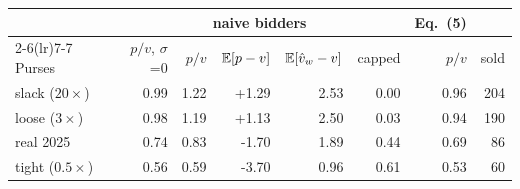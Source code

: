 \begin{tabular}{@{}lrrrrrrr@{}}\toprule
& \multicolumn{5}{c}{naive bidders} & Eq.~(5) & \\\cmidrule(lr){2-6}\cmidrule(lr){7-7}
Purses & $p/v$, $\sigma$=0 & $p/v$ & $\mathbb{E}[p-v]$ & $\mathbb{E}[\hat v_w-v]$ & capped & $p/v$ & sold\\\midrule
slack ($20\times$) & 0.99 & 1.22 & +1.29 & 2.53 & 0.00 & 0.96 & 204\\
loose ($3\times$) & 0.98 & 1.19 & +1.13 & 2.50 & 0.03 & 0.94 & 190\\
real 2025 & 0.74 & 0.83 & -1.70 & 1.89 & 0.44 & 0.69 & 86\\
tight ($0.5\times$) & 0.56 & 0.59 & -3.70 & 0.96 & 0.61 & 0.53 & 60\\
\bottomrule\end{tabular}
